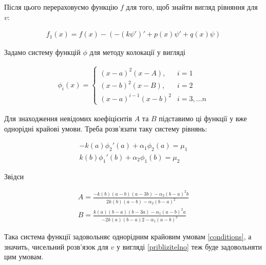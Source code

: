 Після цього перераховуємо функцію  $f$ для того, щоб знайти вигляд рівняння для $v$:
	
	\begin{equation}
	\begin{split}
	f_1(x) = f(x) - \left( -(k\psi')' + p(x)\psi' + q(x)\psi \right)
	\end{split}
	\end{equation}
	
Задамо систему функцій $\phi$ для методу колокації у вигляді 

	\begin{align}
	\phi_i(x) = 
	\begin{cases}
	(x - a)^2(x - A), & i = 1 \\ 
	(x - b)^2(x - B), & i = 2 \\
	(x - a)^{i -1}(x - b)^2 & i = 3, \dots n
	\end{cases}
	\end{align}

Для знаходження невідомих коефіцієнтів $A$ та $B$ підставимо ці функції у вже однорідні крайові умови. Треба розв'язати таку систему рівнянь: 
	
	\begin{equation}
	\begin{split}
	-k(a)\phi_2'(a) + \alpha_1 \phi_2(a) = \mu_1 \\ 
	k(b)\phi_1'(b) + \alpha_2 \phi_1(b) = \mu_2
	\end{split}
	\end{equation}
	
Звідси

	\begin{equation}
	\begin{split}
	A = \frac{-k(b)(a-b)(a-3b) - \alpha_2(b-a)^2b}{2k(b)(a-b) - \alpha_2(b-a)^2} \\
	B = \frac{k(a)(b-a)(b-3a) - \alpha_1(a-b)^2a}{-2k(a)(b-a)2 - \alpha_1(a-b)^2}
	\end{split}
	\end{equation}

Така система функції задовольняє однорідним крайовим умовам \ref{conditions}, а значить, чисельний розв'язок для $v$ у вигляді \ref{priblizitelno} теж буде задовольняти цим умовам.




